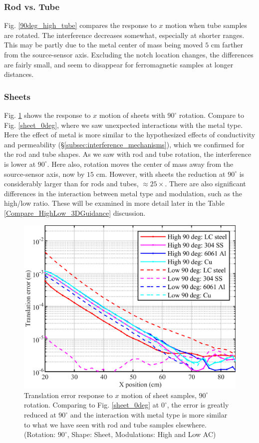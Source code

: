 \documentclass[journal,twoside,web]{ieeecolor}
\begin{document}
\subsubsection{Rod vs. Tube}
Fig. \ref{90deg_high_tube} compares the response to $x$ motion when tube samples are rotated. The interference decreases somewhat, especially at shorter ranges. This may be partly due to the metal center of mass being moved $5$ cm farther from the source-sensor axis. Excluding the notch location changes, the differences are fairly small, and seem to disappear for ferromagnetic samples at longer distances.

\subsubsection{Sheets}
Fig. \ref{sheet_90deg} shows the response to $x$ motion of sheets with $90^\circ$ rotation. Compare to Fig. \ref{sheet_0deg}, where we saw unexpected interactions with the metal type. Here the effect of metal is more similar to the hypothesized effects of conductivity and permeability (\S\ref{subsec:interference_mechanisms}), which we confirmed for the rod and tube shapes. As we saw with rod and tube rotation, the interference is lower at $90^\circ$. Here also, rotation moves the center of mass away from the source-sensor axis, now by $15$ cm. However, with sheets the reduction at $90^\circ$ is considerably larger than for rods and tubes, $\approx 25\times$. There are also significant differences in the interaction between metal type and modulation, such as the high/low ratio. These will be examined in more detail later in the Table \ref{Compare_HighLow_3DGuidance} discussion.

\begin{figure}[H]
\centerline{\includegraphics[width=\columnwidth]{chaic15.png}}
\caption{Translation error response to $x$ motion of sheet samples, $90^\circ$ rotation. Comparing to Fig. \ref{sheet_0deg} at $0^\circ$, the error is greatly reduced at $90^\circ$ and the interaction with metal type is more similar to what we have seen with rod and tube samples elsewhere.
(Rotation: $90^\circ$, Shape: Sheet, Modulations: High and Low AC)
}
\label{sheet_90deg}
\end{figure}
\end{document}
